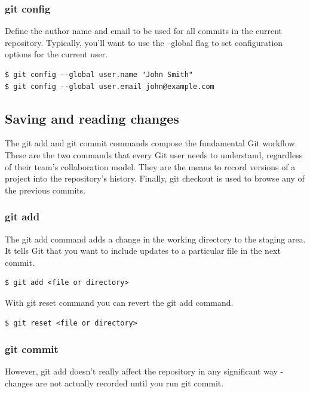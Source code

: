 \documentclass{article}
\begin{document}
\subsubsection*{git config}

Define the author name and email to be used for all commits in the current
repository. Typically, you'll want to use the --global flag to set
configuration options for the current user.

\begin{lstlisting}
$ git config --global user.name "John Smith"
$ git config --global user.email john@example.com 
\end{lstlisting}

\subsection{Saving and reading changes}

The git add and git commit commands compose the fundamental Git
workflow. These are the two commands that every Git user needs to
understand, regardless of their team's collaboration model. They are
the means to record versions of a project into the repository's
history. Finally, git checkout is used to browse any of the previous
commits.

\subsubsection*{git add}

The git add command adds a change in the working directory to the
staging area. It tells Git that you want to include updates to a
particular file in the next commit. 

\begin{lstlisting}
$ git add <file or directory> 
\end{lstlisting}

With git reset command you can revert the git add command.

\begin{lstlisting}
$ git reset <file or directory> 
\end{lstlisting}

\subsubsection*{git commit}

However, git add doesn't really
affect the repository in any significant way - changes are not actually
recorded until you run git commit. 
\end{document}

